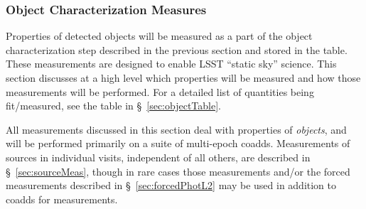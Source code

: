 \subsubsection{Object Characterization Measures}
\label{sec:objchar}

Properties of detected objects will be measured as a part of the object characterization step described in the previous section and stored in the \Object table. These measurements are designed to enable LSST ``static sky'' science. This section discusses at a high level which properties will be measured and how those measurements will be performed. For a detailed list of quantities being fit/measured, see the table in \S~\ref{sec:objectTable}.

All measurements discussed in this section deal with properties of \emph{objects}, and will be performed primarily on a suite of multi-epoch coadds. Measurements of sources in individual visits, independent of all others, are described in \S~\ref{sec:sourceMeas}, though in rare cases those \Source measurements and/or the forced measurements described in \S~\ref{sec:forcedPhotL2} may be used in addition to coadds for \Object measurements.

